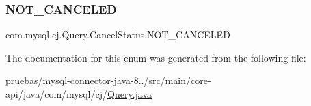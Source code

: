 \subsubsection{\texorpdfstring{N\+O\+T\+\_\+\+C\+A\+N\+C\+E\+L\+ED}{NOT\_CANCELED}}
{\footnotesize\ttfamily com.\+mysql.\+cj.\+Query.\+Cancel\+Status.\+N\+O\+T\+\_\+\+C\+A\+N\+C\+E\+L\+ED}



The documentation for this enum was generated from the following file\+:\begin{DoxyCompactItemize}
\item 
pruebas/mysql-\/connector-\/java-\/8../src/main/core-\/api/java/com/mysql/cj/\mbox{\hyperlink{_query_8java}{Query.\+java}}\end{DoxyCompactItemize}
